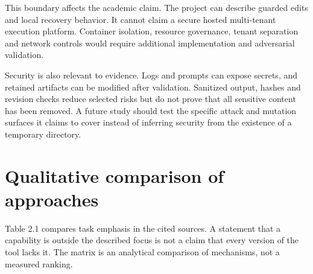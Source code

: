 \documentclass[12pt,a4paper,oneside]{report}
\begin{document}
This boundary affects the academic claim. The project can describe guarded edits and local recovery behavior. It cannot claim a secure hosted multi-tenant execution platform. Container isolation, resource governance, tenant separation and network controls would require additional implementation and adversarial validation.

Security is also relevant to evidence. Logs and prompts can expose secrets, and retained artifacts can be modified after validation. Sanitized output, hashes and revision checks reduce selected risks but do not prove that all sensitive content has been removed. A future study should test the specific attack and mutation surfaces it claims to cover instead of inferring security from the existence of a temporary directory.

\section{Qualitative comparison of approaches}

Table 2.1 compares task emphasis in the cited sources. A statement that a capability is outside the described focus is not a claim that every version of the tool lacks it. The matrix is an analytical comparison of mechanisms, not a measured ranking.
\end{document}
